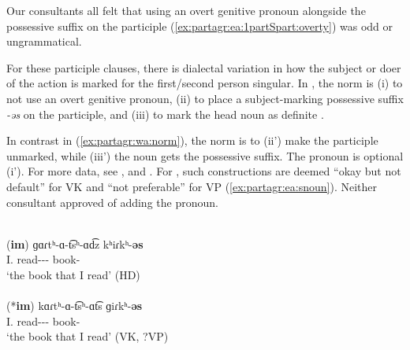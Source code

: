 Our {\seaSEA} consultants       all felt that using an overt genitive pronoun alongside the possessive suffix on the participle   (\ref{ex:partagr:ea:1partSpart:overty}) was odd or ungrammatical.   



For these participle clauses, there is dialectal variation in how the subject or doer of the action is marked for the first/second person singular. In {\seaSEA}, the norm is (i) to not use an overt genitive pronoun, (ii) to place a subject-marking  possessive suffix \textit{-əs} on the participle, and (iii) to mark the head noun as definite  \citep[508--509]{DumTragut-2009-ArmenianReferenceGrammar}. 

In contrast  in {\swaSWA} (\ref{ex:partagr:wa:norm}), the norm is to (ii') make the participle unmarked, while (iii') the noun gets the possessive suffix. The pronoun is optional (i'). For more data, see \citet{AckermanNikolaeva-1997-IdentityFormDifferenceFunctionPersonNumberArmenianOstyak,Ackerman-1998-ConstructionsMixedCategorySemanticPersonNumber,AckemaNeeleman-2004-BeyondMorpho}, and \citet[284ff]{AckermanNikolaeve-2014-DescriptiveTypologyLingTheoryRelativeClause}.  For {\seaSE}, such  constructions are deemed ``okay but not default'' for VK and ``not preferable'' for   VP (\ref{ex:partagr:ea:snoun}). Neither consultant approved  of adding the pronoun.





\begin{exe}
	\ex 
	\begin{xlist}
		\ex {\swaSWA} \\ \gll  (\textbf{im}) ɡɑɾtʰ-ɑ-t͡sʰ-ɑd͡z kʰiɾkʰ-\textbf{əs} \\
		I.{\gen} read-{\thgloss}-{\aorother}-{\rptcp}   book-{\possFsg} \\
		\trans `the book that I read' \label{ex:partagr:wa:norm} \hfill (HD) \\
		\ex {\seaSEA} \\ \gll (*\textbf{im})   kɑɾtʰ-ɑ-t͡sʰ-ɑt͡s ɡiɾkʰ-\textbf{əs} \\
		I.{\gen} read-{\thgloss}-{\aorother}-{\rptcp}   book-{\possFsg} \\
		\trans `the book that I read' \label{ex:partagr:ea:snoun} \hfill (VK, ?VP) \\
		
\end{xlist}\end{exe}


